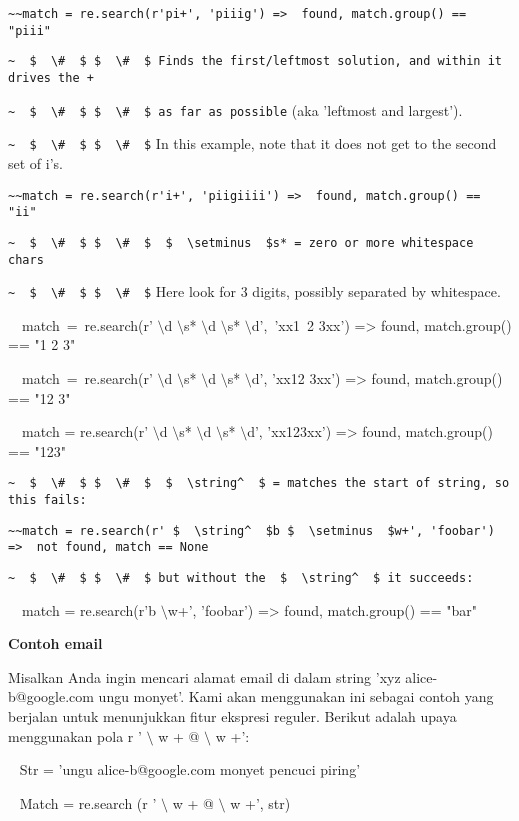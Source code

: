 \begin{enumerate}
\begin{enumerate}
\verb|~~match = re.search(r'pi+', 'piiig') =>  found, match.group() == "piii"|

\verb|~  $  \#  $ $  \#  $ Finds the first/leftmost solution, and within it drives the +|

\verb|~  $  \#  $ $  \#  $ as far as possible| (aka 'leftmost and largest').

\verb|~  $  \#  $ $  \#  $| In this example, note that it does not get to the second set of i's.

\verb|~~match = re.search(r'i+', 'piigiiii') =>  found, match.group() == "ii"|

\verb|~  $  \#  $ $  \#  $  $  \setminus  $s* = zero or more whitespace chars|

\verb|~  $  \#  $ $  \#  $| Here look for 3 digits, possibly separated by whitespace.

~~match~=~re.search(r' $  \setminus  $d $  \setminus  $s* $  \setminus  $d $  \setminus  $s* $  \setminus  $d',~'xx1~2   3xx') =>  found, match.group() == "1 2   3"

~~match~=~re.search(r' $  \setminus  $d $  \setminus  $s* $  \setminus  $d $  \setminus  $s* $  \setminus  $d', 'xx12  3xx') =>  found, match.group() == "12  3"

~~match = re.search(r' $  \setminus  $d $  \setminus  $s* $  \setminus  $d $  \setminus  $s* $  \setminus  $d', 'xx123xx') =>  found, match.group() == "123"

\verb|~  $  \#  $ $  \#  $  $  \string^  $ = matches the start of string, so this fails:|

\verb|~~match = re.search(r' $  \string^  $b $  \setminus  $w+', 'foobar') =>  not found, match == None|

\verb|~  $  \#  $ $  \#  $ but without the  $  \string^  $ it succeeds:|

~~match = re.search(r'b $  \setminus  $w+', 'foobar') =>  found, match.group() == "bar"

{\fontsize{14pt}{14pt}\selectfont \textbf{Contoh email} \\} \par
Misalkan Anda ingin mencari alamat email di dalam string 'xyz alice-b@google.com ungu monyet'. Kami akan menggunakan ini sebagai contoh yang berjalan untuk menunjukkan fitur ekspresi reguler. Berikut adalah upaya menggunakan pola r ' $  \setminus  $ w + @  $  \setminus  $ w +':

~ Str = 'ungu alice-b@google.com monyet pencuci piring'

~ Match = re.search (r ' $  \setminus  $ w + @  $  \setminus  $ w +', str)


\end{enumerate}
\end{enumerate}
